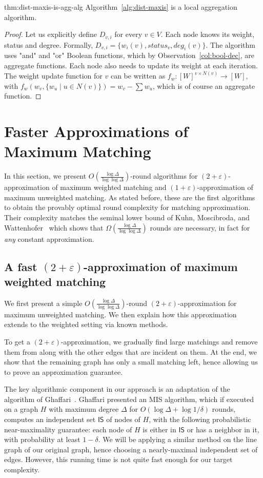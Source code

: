 \documentclass[11pt]{article}
\newcommand{\eps}{\varepsilon}
\newenvironment{theorem-repeat}[1]{\begin{trivlist}
\item[\hspace{\labelsep}{\bf\noindent Theorem \ref{#1} }]\em }%
{\end{trivlist}}
\begin{document}
\begin{theorem-repeat}{thm:dist-maxis-is-agg-alg}
	Algorithm~\ref{alg:dist-maxis} is a local aggregation algorithm.
\end{theorem-repeat}
\begin{proof}
	Let us explicitly define $D_{v,i}$ for every $v\in V$. Each node knows its weight, status and degree. Formally, $D_{v,i} = \{w_i(v), status_v, deg_i(v)\}$.
	The algorithm uses "and" and "or" Boolean functions, which by Observation~\ref{col:bool-dec}, are aggregate functions. Each node also needs to update its weight at each iteration. The weight update function for $v$ can be written as $f_w: [W]^{{v}\times N(v)} \rightarrow [W]$, with $f_w(w_v, \{w_u \mid u \in N(v) \}) = w_v - \sum w_u$, which is of course an aggregate function.	
\end{proof}
\section{Faster Approximations of Maximum Matching}
\label{sec:2epsMM}
In this section, we present $O(\frac{\log \Delta}{\log\log \Delta})$-round algorithms for $(2+\eps)$-approximation of maximum weighted matching and $(1+\eps)$-approximation of maximum unweighted matching. As stated before, these are the first algorithms to obtain the provably optimal round complexity for matching approximation. Their complexity matches the seminal lower bound of Kuhn, Moscibroda, and Wattenhofer~\cite{kuhn2006price} which shows that $\Omega(\frac{\log \Delta}{\log\log \Delta})$ rounds are necessary, in fact for \emph{any} constant approximation.



\subsection{A fast $(2+\eps)$-approximation of maximum weighted matching}\label{lem:NMIS}
We first present a simple $O(\frac{\log \Delta}{\log\log \Delta})$-round $(2+\eps)$-approximation for maximum unweighted matching. We then explain how this approximation extends to the weighted setting via known methods.

To get a $(2+\eps)$-approximation, we gradually find large matchings and remove them from along with the other edges that are incident on them. At the end, we show that the remaining graph has only a small matching left, hence allowing us to prove an approximation guarantee. 

The key algorithmic component in our approach is an adaptation of the algorithm of Ghaffari~\cite{Ghaffari2016}. Ghaffari presented an MIS algorithm, which if executed on a graph $H$ with maximum degree $\Delta$ for $O(\log \Delta + \log 1/\delta)$ rounds, computes an independent set $\mathsf{IS}$ of nodes of $H$, with the following probabilistic near-maximality guarantee: each node of $H$ is either in $\mathsf{IS}$ or has a neighbor in it, with probability at least $1-\delta$. We will be applying a similar method on the line graph of our original graph, hence choosing a nearly-maximal independent set of edges. However, this running time is not quite fast enough for our target complexity.
\end{document}
